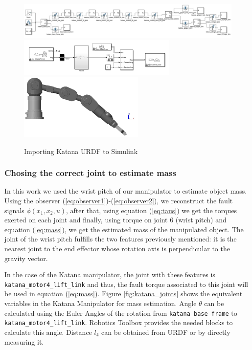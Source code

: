 \documentclass[a4paper, 10pt]{article}
\begin{document}
\begin{figure}
  \centering
  \includegraphics[width=\textwidth]{Figures/KatanaSimscape.png}
  \includegraphics[width=0.7\textwidth]{Figures/KatanaSimulinkROS.png}
  \includegraphics[width=0.55\textwidth]{Figures/KatanaMechanics.png}
  \caption{Importing Katana URDF to Simulink}
  \label{fig:KatanaSimulink}
\end{figure}

\subsubsection*{Chosing the correct joint to estimate mass}
In this work we used the wrist pitch of our manipulator to estimate object mass. Using the observer (\ref{eq:observer1})-(\ref{eq:observer2}), we reconstruct the fault signals $\phi(x_1, x_2, u)$, after that, using equation (\ref{eq:taus}) we get the torques exerted on each joint and finally, using torque on joint 6 (wrist pitch) and equation (\ref{eq:mass}), we get the estimated mass of the manipulated object. The joint of the wrist pitch fulfills the two features previously mentioned: it is the nearest joint to the end effector whose rotation axis is perpendicular to the gravity vector.

In the case of the Katana manipulator, the joint with these features is \texttt{katana\_motor4\_lift\_link} and thus, the fault torque associated to this joint will be used in equation (\ref{eq:mass}). Figure \ref{fig:katana_joints} shows the equivalent variables in the Katana Manipulator for mass estimation. Angle $\theta$ can be calculated using the Euler Angles of the rotation from \texttt{katana\_base\_frame} to \texttt{katana\_motor4\_lift\_link}. Robotics Toolbox provides the needed blocks to calculate this angle. Distance $l_4$ can be obtained from URDF or by directly measuring it. 
\end{document}
